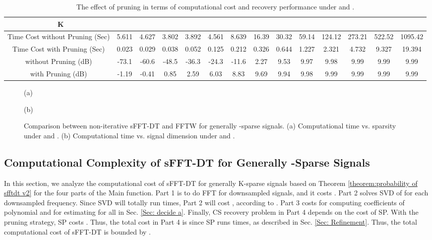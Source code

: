 \documentclass[journal,onecolumn,11pt]{IEEEtran}
\begin{document}
\begin{table}[t]
\fontsize{7.5pt}{1em}\selectfont
\centering
\setlength{\abovecaptionskip}{0pt}
\setlength{\belowcaptionskip}{4pt}
\caption{The effect of pruning in terms of computational cost and recovery performance under  and  .}
\label{Table: pruning comparision 3}
\doublerulesep=2pt
\begin{tabular}[tc]{|c|c|c|c|c|c|c|c|c|c|c|c|c|c|}
\hline
{\LARGE \textcolor{white}{o}}K& & &  & &  &  &  &  &  &  &  &  &  \\ \hline
Time Cost without Pruning (Sec)& 5.611& 4.627& 3.802 & 3.892 & 4.561 & 8.639 & 16.39 & 30.32 & 59.14& 124.12 & 273.21 & 522.52& 1095.42 \\ \hline
Time Cost with Pruning (Sec)& 0.023&  0.029 & 0.038 & 0.052 & 0.125 & 0.212 & 0.326 & 0.644 & 1.227 & 2.321 & 4.732 & 9.327 & 19.394\\ \hline
 without Pruning (dB)& -73.1& -60.6& -48.5 & -36.3 & -24.3 & -11.6 & 2.27 & 9.53 & 9.97 & 9.98 & 9.99 & 9.99 & 9.99\\ \hline
  with Pruning (dB)& -1.19& -0.41& 0.85 & 2.59 & 6.03 & 8.83 & 9.69 & 9.94 & 9.98 & 9.99 & 9.99 & 9.99 & 9.99  \\ \hline
\end{tabular}
\end{table}


\begin{figure*}[!t]
\begin{minipage}[b]{.48\linewidth}
  \centerline{(a)}
\end{minipage}
\begin{minipage}[b]{.48\linewidth}
  \centerline{(b)}
\end{minipage}
\hfill
\caption{Comparison between non-iterative sFFT-DT and FFTW for generally -sparse signals. (a) Computational time vs. sparsity under  and . (b) Computational time vs. signal dimension under  and . }
\label{fig:general computational time}
\end{figure*}

\subsection{Computational Complexity of sFFT-DT for Generally -Sparse Signals}\label{Sec: Complexity  for General Ksparse Signal}
In this section, we analyze the computational cost of sFFT-DT for generally K-sparse signals based on Theorem \ref{theorem:probability of sfftdt v2} for the four parts of the Main function. 
Part 1 is to do FFT for downsampled signals, and it costs .
Part 2 solves SVD of  for each downsampled frequency.
Since SVD will totally run  times, Part 2 will cost , according to \cite{Angelika1988}.
Part 3 costs  for computing coefficients of polynomial and  for estimating  for all  in Sec. \ref{Sec: decide a}.
Finally, CS recovery problem in Part 4 depends on the cost of SP.
With the pruning strategy, SP costs .
Thus, the total cost in Part 4 is  since SP runs  times, as described in Sec. \ref{Sec: Refinement}.
Thus, the total computational cost of sFFT-DT is bounded by .
\end{document}
